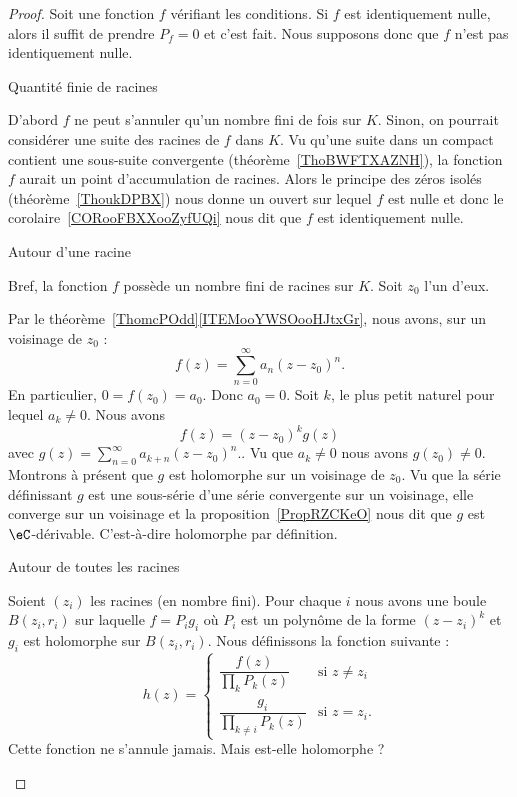 \begin{proof}
	Soit une fonction $f$ vérifiant les conditions. Si \( f\) est identiquement nulle, alors il suffit de prendre \( P_f=0\) et c'est fait. Nous supposons donc que \( f\) n'est pas identiquement nulle.

	\begin{subproof}
		\item[Quantité finie de racines]

		D'abord \( f\) ne peut s'annuler qu'un nombre fini de fois sur \( K\). Sinon, on pourrait considérer une suite des racines de \( f\) dans \( K\). Vu qu'une suite dans un compact contient une sous-suite convergente (théorème~\ref{ThoBWFTXAZNH}), la fonction \( f\) aurait un point d'accumulation de racines. Alors le principe des zéros isolés (théorème~\ref{ThoukDPBX}) nous donne un ouvert sur lequel \( f\) est nulle et donc le corolaire~\ref{CORooFBXXooZyfUQi} nous dit que \( f\) est identiquement nulle.

		\item[Autour d'une racine]

		Bref, la fonction \( f\) possède un nombre fini de racines sur \( K\). Soit \( z_0\) l'un d'eux.

		Par le théorème~\ref{ThomcPOdd}\ref{ITEMooYWSOooHJtxGr}, nous avons, sur un voisinage de \( z_0\) :
		\begin{equation}
			f(z)=\sum_{n=0}^{\infty}a_n(z-z_0)^n.
		\end{equation}
		En particulier, \( 0=f(z_0)=a_0\). Donc \( a_0=0\). Soit \( k\), le plus petit naturel pour lequel \( a_k\neq 0\). Nous avons
		\begin{equation}
			f(z)=(z-z_0)^kg(z)
		\end{equation}
		avec \( g(z)= \sum_{n=0}^{\infty}a_{k+n}(z-z_0)^n.\). Vu que \( a_{k}\neq 0\) nous avons \( g(z_0)\neq 0\). Montrons à présent que \( g\) est holomorphe sur un voisinage de \( z_0\). Vu que la série définissant \( g\) est une sous-série d'une série convergente sur un voisinage, elle converge sur un voisinage et la proposition~\ref{PropRZCKeO} nous dit que \( g\) est \( \eC\)-dérivable. C'est-à-dire holomorphe par définition.

		\item[Autour de toutes les racines]

		Soient \( (z_i)\) les racines (en nombre fini). Pour chaque \( i\) nous avons une boule \( B(z_i,r_i)\) sur laquelle \( f=P_ig_i\) où \( P_i\) est un polynôme de la forme \( (z-z_i)^k\) et \( g_i\) est holomorphe sur \( B(z_i,r_i)\). Nous définissons la fonction suivante :
		\begin{equation}
			h(z)=\begin{cases}
				\dfrac{ f(z) }{ \prod_kP_k(z) }        & \text{si } z\neq z_i \\
				\dfrac{ g_i }{ \prod_{k\neq i}P_k(z) } & \text{si } z=z_i.
			\end{cases}
		\end{equation}
		Cette fonction ne s'annule jamais. Mais est-elle holomorphe ?


\end{subproof}
\end{proof}
